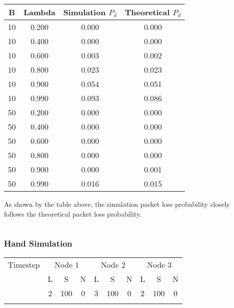 \documentclass{article}
\newcounter{magicrownumbers}
\newcommand\rownumber{\stepcounter{magicrownumbers}\arabic{magicrownumbers}}
\begin{document}
\section{}
\begin{center}
\begin{tabular}{c | c | c | c}
    B   & Lambda  & Simulation $P_d$    & Theoretical $P_d$ \\
    \hline
    10  & 0.200   & 0.000   & 0.000 \\
    10  & 0.400   & 0.000   & 0.000 \\
    10  & 0.600   & 0.003   & 0.002 \\ 
    10  & 0.800   & 0.023   & 0.023 \\
    10  & 0.900   & 0.054   & 0.051 \\
    10  & 0.990   & 0.093   & 0.086 \\
    50  & 0.200   & 0.000   & 0.000 \\
    50  & 0.400   & 0.000   & 0.000 \\
    50  & 0.600   & 0.000   & 0.000 \\
    50  & 0.800   & 0.000   & 0.000 \\
    50  & 0.900   & 0.000   & 0.001 \\
    50  & 0.990   & 0.016   & 0.015 \\
\end{tabular}
\end{center}
As shown by the table above, the simulation packet loss probability closely follows the theoretical packet loss probability.

\part{}	
\section*{Hand Simulation}
\begin{center}
\begin{tabular}{| c | c | c | c | c | c | c | c | c | c |}
	\hline
    Timestep & \multicolumn{3}{|c|}{Node 1} & \multicolumn{3}{|c|}{Node 2} & \multicolumn{3}{|c|}{Node 3} \\
    \cline{2-10}
      & L & S & N & L & S & N & L & S & N \\
    \hline
    \rownumber & 2 & 100 & 0 & 3 & 100 & 0 & 2 & 100 & 0 \\
    \hline
    \rownumber &  &  &  &  &  &  &  &  &  \\
    \hline
\end{tabular}
\end{center}
	
\end{document}
